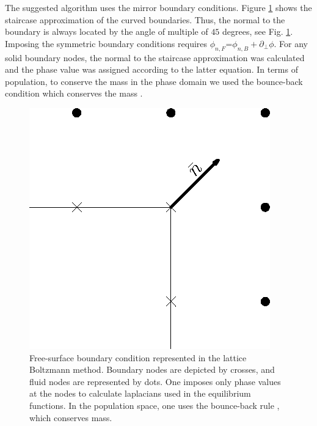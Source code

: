 \documentclass{article}
\begin{document}
The suggested algorithm uses the mirror boundary conditions. Figure \ref{fig:free:surface} shows the staircase approximation of the curved boundaries. 
Thus, the normal to the boundary is always located by the angle of multiple of $45$ degrees, see Fig. \ref{fig:free:surface}.  Imposing the
symmetric boundary conditions requires $\phi_{n,F}$=$\phi_{n,B}+\partial_{\perp} \phi$. For any solid boundary nodes, the normal to the staircase approximation was calculated and the phase value was assigned according to the latter equation.  In terms of population, to conserve the mass in the phase domain we used the bounce-back condition which conserves the mass \cite{yu}.  
\begin{figure}
\includegraphics[width=\textwidth]{Figures/free_surface.eps}
\caption{Free-surface boundary condition represented in the lattice Boltzmann method. 
Boundary nodes are depicted by crosses, and fluid nodes are represented by dots. One imposes only phase values at the nodes to calculate laplacians used in the equilibrium functions. In the population space, one uses the bounce-back rule \cite{yu}, which conserves mass.
\label{fig:free:surface}}
\end{figure}
\end{document}
